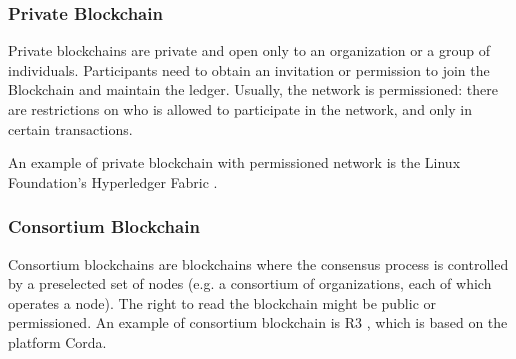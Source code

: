 \subsubsection*{Private Blockchain} Private blockchains are private and open
only to an organization or a group of individuals. Participants need to obtain
an invitation or permission to join the Blockchain and maintain the ledger.
Usually, the network is permissioned: there are restrictions on who is allowed to
participate in the network, and only in certain transactions.

An example of private blockchain with permissioned network is the Linux
Foundation's Hyperledger Fabric \cite{hyperledger-fabric}.

\subsubsection*{Consortium Blockchain}
Consortium blockchains are blockchains where the consensus process is controlled
by a preselected set of nodes (e.g. a consortium of organizations, each of which
operates a node). The right to read the blockchain might be public or permissioned.
An example of consortium blockchain is R3 \cite{R3}, which is based on the platform Corda.

